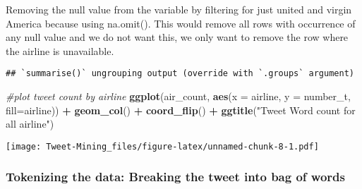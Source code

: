 \documentclass[
]{article}
\newenvironment{Shaded}{\begin{snugshade}}{\end{snugshade}}
\newcommand{\CommentTok}[1]{\textcolor[rgb]{0.56,0.35,0.01}{\textit{#1}}}
\newcommand{\DataTypeTok}[1]{\textcolor[rgb]{0.13,0.29,0.53}{#1}}
\newcommand{\KeywordTok}[1]{\textcolor[rgb]{0.13,0.29,0.53}{\textbf{#1}}}
\newcommand{\NormalTok}[1]{#1}
\newcommand{\OperatorTok}[1]{\textcolor[rgb]{0.81,0.36,0.00}{\textbf{#1}}}
\newcommand{\StringTok}[1]{\textcolor[rgb]{0.31,0.60,0.02}{#1}}
\begin{document}
Removing the null value from the variable by filtering for just united
and virgin America because using na.omit(). This would remove all rows
with occurrence of any null value and we do not want this, we only want
to remove the row where the airline is unavailable.

\begin{Shaded}
\end{Shaded}

\begin{verbatim}
## `summarise()` ungrouping output (override with `.groups` argument)
\end{verbatim}

\begin{Shaded}
\begin{Highlighting}[]
\CommentTok{#plot tweet count by airline}
\KeywordTok{ggplot}\NormalTok{(air_count, }\KeywordTok{aes}\NormalTok{(}\DataTypeTok{x =}\NormalTok{ airline, }\DataTypeTok{y =}\NormalTok{ number_t, }\DataTypeTok{fill=}\NormalTok{airline)) }\OperatorTok{+}\StringTok{ }\KeywordTok{geom_col}\NormalTok{() }\OperatorTok{+}\StringTok{ }\KeywordTok{coord_flip}\NormalTok{() }\OperatorTok{+}\StringTok{ }\KeywordTok{ggtitle}\NormalTok{(}\StringTok{"Tweet Word count for all airline"}\NormalTok{)}
\end{Highlighting}
\end{Shaded}

\texttt{[image: Tweet-Mining\_files/figure-latex/unnamed-chunk-8-1.pdf]}

\hypertarget{tokenizing-the-data-breaking-the-tweet-into-bag-of-words}{%
\subsubsection{Tokenizing the data: Breaking the tweet into bag of
words}\label{tokenizing-the-data-breaking-the-tweet-into-bag-of-words}}
\end{document}
